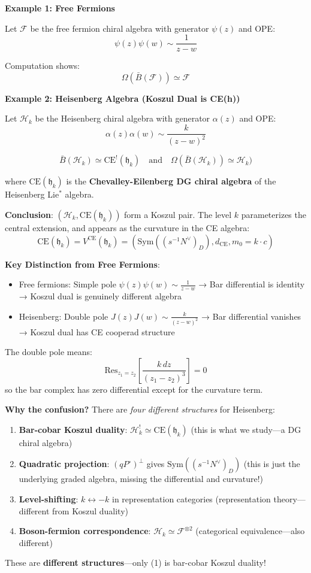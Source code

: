 \begin{example}
\label{ex:three-koszul-instances}

\textbf{Example 1: Free Fermions}

Let $\mathcal{F}$ be the free fermion chiral algebra with generator $\psi(z)$ and OPE:
$$\psi(z)\psi(w) \sim \frac{1}{z-w}$$

Computation shows:
$$\Omega(\bar{B}(\mathcal{F})) \simeq \mathcal{F}$$


\textbf{Example 2: Heisenberg Algebra (Koszul Dual is CE(h))}

Let $\mathcal{H}_k$ be the Heisenberg chiral algebra with generator $\alpha(z)$ and OPE:
$$\alpha(z)\alpha(w) \sim \frac{k}{(z-w)^2}$$
 
$$\bar{B}(\mathcal{H}_k) \simeq \text{CE}^!(\mathfrak{h}_k) \quad \text{and} \quad 
  \Omega(\bar{B}(\mathcal{H}_k)) \simeq \mathcal{H}_k)$$

where $\text{CE}(\mathfrak{h}_k)$ is the \textbf{Chevalley-Eilenberg DG chiral algebra} of the Heisenberg Lie$^*$ algebra.

\textbf{Conclusion}: $(\mathcal{H}_k, \text{CE}(\mathfrak{h}_k))$ form a Koszul pair. The level $k$ 
parameterizes the central extension, and appears as the curvature in the CE algebra:
$$\text{CE}(\mathfrak{h}_k) = V^{\text{CE}}(\mathfrak{h}_k) = (\text{Sym}((s^{-1}N^\vee)_D), d_{\text{CE}}, m_0 = k \cdot c)$$

\textbf{Key Distinction from Free Fermions}:
\begin{itemize}
\item Free fermions: Simple pole $\psi(z)\psi(w) \sim \frac{1}{z-w}$ → Bar differential is identity → Koszul dual is genuinely different algebra
\item Heisenberg: Double pole $J(z)J(w) \sim \frac{k}{(z-w)^2}$ → Bar differential vanishes → Koszul dual has CE cooperad structure
\end{itemize}

The double pole means:
$$\text{Res}_{z_1=z_2}\left[\frac{k \, dz}{(z_1-z_2)^3}\right] = 0$$
so the bar complex has zero differential except for the curvature term.

\textbf{Why the confusion?} There are \emph{four different structures} for Heisenberg:
\begin{enumerate}
\item \textbf{Bar-cobar Koszul duality}: $\mathcal{H}_k^! \simeq \text{CE}(\mathfrak{h}_k)$ 
      (this is what we study—a DG chiral algebra)
\item \textbf{Quadratic projection}: $(qP^\circ)^\perp$ gives $\text{Sym}((s^{-1}N^\vee)_D)$
      (this is just the underlying graded algebra, missing the differential and curvature!)
\item \textbf{Level-shifting}: $k \leftrightarrow -k$ in representation categories 
      (representation theory—different from Koszul duality)
\item \textbf{Boson-fermion correspondence}: $\mathcal{H}_k \simeq \mathcal{F}^{\otimes 2}$ 
      (categorical equivalence—also different)
\end{enumerate}
These are \textbf{different structures}—only (1) is bar-cobar Koszul duality!


\end{example}
